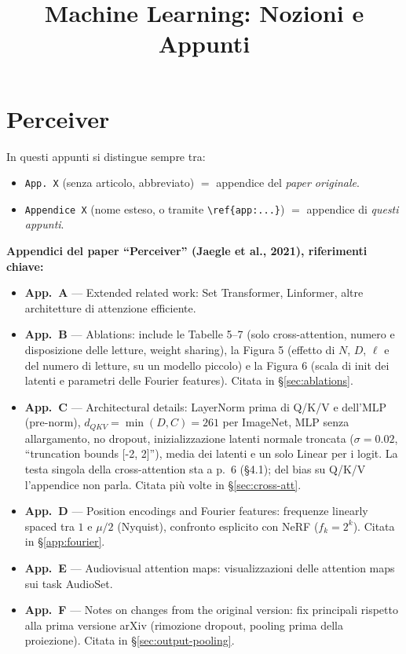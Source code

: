 \documentclass[
  11pt,
]{article}
\title{Machine Learning: Nozioni e Appunti}
\author{}
\date{}
\begin{document}
\maketitle
\tableofcontents
\clearpage

\section{Perceiver}
\label{sec:perceiver-cap}

\begin{notabox}[title={\textbf{Convenzione sulle citazioni e mappa delle appendici del paper}}]
In questi appunti si distingue sempre tra:
\begin{itemize}\setlength\itemsep{0.1em}
\item \texttt{App.\ X} (senza articolo, abbreviato) $=$ appendice del \emph{paper originale}.
\item \texttt{Appendice X} (nome esteso, o tramite \texttt{\textbackslash ref\{app:...\}}) $=$ appendice di \emph{questi appunti}.
\end{itemize}

\medskip
\textbf{Appendici del paper ``Perceiver'' (Jaegle et al., 2021), riferimenti chiave:}
\begin{itemize}\setlength\itemsep{0.1em}
\item \textbf{App.\ A} --- Extended related work: Set Transformer, Linformer, altre architetture di attenzione efficiente.
\item \textbf{App.\ B} --- Ablations: include le Tabelle 5--7 (solo cross-attention, numero e disposizione delle letture, weight sharing), la Figura 5 (effetto di $N$, $D$, $\ell$ e del numero di letture, su un modello piccolo) e la Figura 6 (scala di init dei latenti e parametri delle Fourier features). Citata in \S\ref{sec:ablations}.
\item \textbf{App.\ C} --- Architectural details: LayerNorm prima di Q/K/V e dell'MLP (pre-norm), $d_{QKV} = \min(D, C) = 261$ per ImageNet, MLP senza allargamento, no dropout, inizializzazione latenti normale troncata ($\sigma = 0.02$, ``truncation bounds [-2, 2]''), media dei latenti e un solo Linear per i logit. La testa singola della cross-attention sta a p.~6 (\S4.1); del bias su Q/K/V l'appendice non parla. Citata più volte in \S\ref{sec:cross-att}.
\item \textbf{App.\ D} --- Position encodings and Fourier features: frequenze linearly spaced tra $1$ e $\mu/2$ (Nyquist), confronto esplicito con NeRF ($f_k = 2^k$). Citata in \S\ref{app:fourier}.
\item \textbf{App.\ E} --- Audiovisual attention maps: visualizzazioni delle attention maps sui task AudioSet.
\item \textbf{App.\ F} --- Notes on changes from the original version: fix principali rispetto alla prima versione arXiv (rimozione dropout, pooling prima della proiezione). Citata in \S\ref{sec:output-pooling}.
\end{itemize}
\end{notabox}
\end{document}
